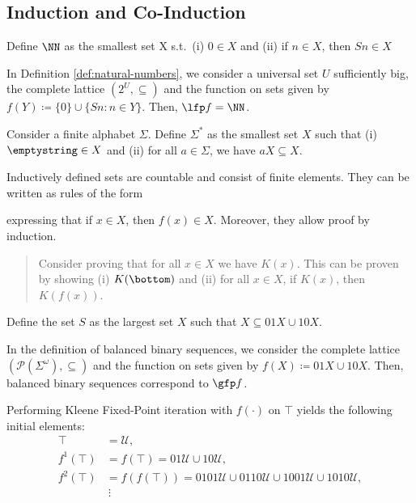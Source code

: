 \subsection{Induction and Co-Induction}

\begin{definition}
\label{def:natural-numbers}
    Define $\NN$ as the smallest set X s.t.\ (i) $0 \in X$ and (ii) if $n \in X$, then $S n \in X$
\end{definition}

\begin{remark}
    In Definition \ref{def:natural-numbers}, we consider a universal set $U$ sufficiently big, the complete lattice $(2^U, \subseteq)$ and the function on sets given by $f(Y) \coloneqq \{0\} \cup \{ S n : n \in Y \}$. 
Then, $\lfp f = \NN$.	
\end{remark}



\begin{definition}
    Consider a finite alphabet $\Sigma$.
	Define $\Sigma^*$ as the smallest set $X$ such that (i) $\emptystring \in X$ and (ii) for all $a \in \Sigma$, we have $aX \subseteq X$.
\end{definition}

\begin{remark}
    Inductively defined sets are countable and consist of finite elements.
    They can be written as rules of the form
\begin{prooftree}
\end{prooftree}
    expressing that if $x \in X$, then $f(x) \in X$. Moreover, they allow proof by induction. 
    \begin{quote}
         Consider proving that for all $x \in X$ we have $K(x)$. This can be proven by showing (i) $K(\bottom)$ and (ii) for all $x \in X$, if $K(x)$, then $K(f(x))$.
    \end{quote}
\end{remark}

\begin{definition}
    Define the set $S$ as the largest set $X$ such that $X \subseteq 01X \cup 10X$.
\end{definition}


\begin{remark}
    In the definition of balanced binary sequences, we consider the complete lattice $(\mathcal{P}(\Sigma^\omega), \subseteq)$ and the function on sets given by $f(X) \coloneqq 01X \cup 10X$. Then, balanced binary sequences correspond to $\gfp f$.	
    
    Performing Kleene Fixed-Point iteration with $f(\cdot)$ on $\top$ yields the following initial elements:
    \begin{align*}
        \top &= \mathcal{U}, \\
        f^1(\top) &= f(\top) = 01\mathcal{U} \cup 10\mathcal{U}, \\
        f^2(\top) &= f(f(\top)) = 0101\mathcal{U} \cup 0110\mathcal{U} \cup 1001\mathcal{U} \cup 1010\mathcal{U}, \\
        &\ \vdots
    \end{align*}
\end{remark}


